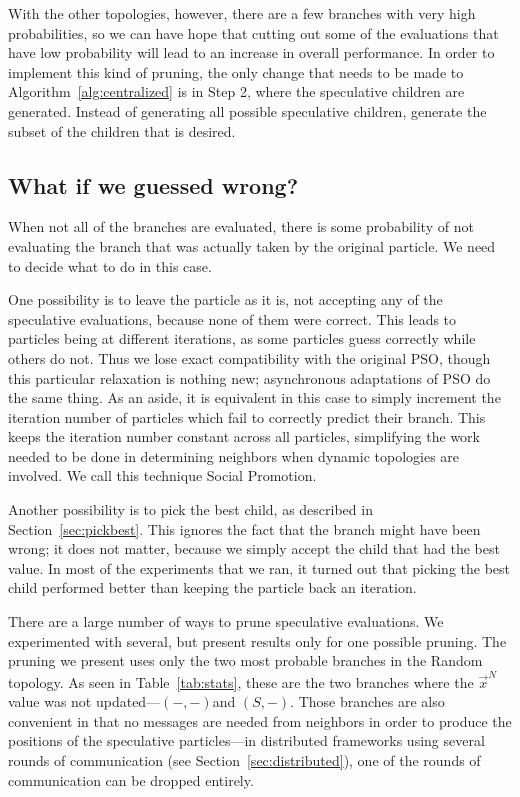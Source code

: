\documentclass[journal,letterpaper]{IEEEtran}
\renewcommand{\sec}[1]{Section~\ref{sec:#1}}
\newcommand{\alg}[1]{Algorithm~\ref{alg:#1}}
\providecommand{\neigh}{\ensuremath{N}}
\providecommand{\nbest}{\ensuremath{\Vec{x}^\neigh}}
\providecommand{\casexn}{\ensuremath{(S,-)}}
\providecommand{\casepn}{\ensuremath{(-,-)}}
\begin{document}
With the other topologies, however, there are a few branches with very high
probabilities, so we can have hope that cutting out some of the evaluations
that have low probability will lead to an increase in overall performance.  In
order to implement this kind of pruning, the only change that needs to be made
to \alg{centralized} is in Step 2, where the speculative children are
generated.  Instead of generating all possible speculative children, generate
the subset of the children that is desired.

\subsection{What if we guessed wrong?}
\label{sec:wrong}

When not all of the branches are evaluated, there is some probability of not
evaluating the branch that was actually taken by the original particle.  We 
need to decide what to do in this case.  

One possibility is to leave the particle as it is, not accepting any of the
speculative evaluations, because none of them were correct.  This leads to
particles being at different iterations, as some particles guess correctly
while others do not.  Thus we lose exact compatibility with the original PSO,
though this particular relaxation is nothing new; asynchronous adaptations of
PSO do the same thing.  As an aside, it is equivalent in this case to simply
increment the iteration number of particles which fail to correctly predict
their branch.  This keeps the iteration number constant across all particles,
simplifying the work needed to be done in determining neighbors when dynamic
topologies are involved.  We call this technique Social Promotion.

Another possibility is to pick the best child, as described in \sec{pickbest}.
This ignores the fact that the branch might have been wrong; it does not
matter, because we simply accept the child that had the best value.  In most of
the experiments that we ran, it turned out that picking the best child
performed better than keeping the particle back an iteration.

There are a large number of ways to prune speculative evaluations.  We
experimented with several, but present results only for one possible pruning.
The pruning we present uses only the two most probable branches in the Random
topology.  As seen in Table~\ref{tab:stats}, these are the two branches where
the $\nbest$ value was not updated---\casepn and \casexn.  Those branches are
also convenient in that no messages are needed from neighbors in order to
produce the positions of the speculative particles---in distributed frameworks
using several rounds of communication (see \sec{distributed}), one of the
rounds of communication can be dropped entirely.
\end{document}
